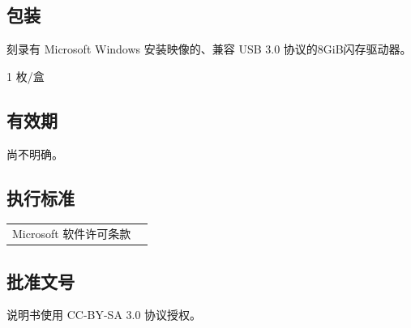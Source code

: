 \documentclass{article}
\begin{document}
\begin{multicols*}{3}
	\begin{tcolorbox}
	\section*{包装}
	\end{tcolorbox}

	刻录有 Microsoft Windows 安装映像的、兼容 USB 3.0 协议的8GiB闪存驱动器。

	1 枚/盒

	\medskip


	\begin{tcolorbox}
	\section*{有效期}
	\end{tcolorbox}

	尚不明确。

	\medskip


	\begin{tcolorbox}
	\section*{执行标准}
	\end{tcolorbox}
	\begin{tabularx}{\linewidth}{@{}ll@{}}
	
	Microsoft 软件许可条款
 
	\end{tabularx}

	\medskip


	\begin{tcolorbox}
	\section*{批准文号}
	\end{tcolorbox}

	说明书使用 CC-BY-SA 3.0 协议授权。

	\medskip


%
%


	\begin{tcolorbox}

\end{tcolorbox}
\end{multicols*}
\end{document}
